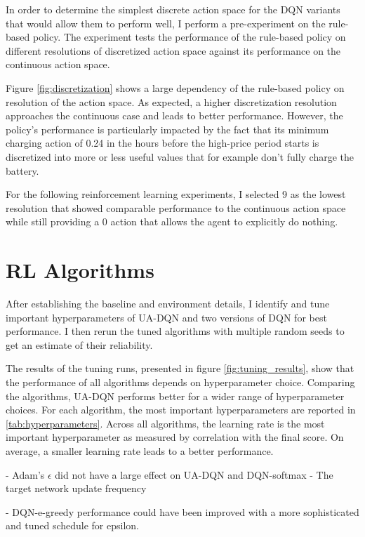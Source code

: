 In order to determine the simplest discrete action space for the DQN variants that would allow them to perform well, I perform a pre-experiment on the rule-based policy.
The experiment tests the performance of the rule-based policy on different resolutions of discretized action space against its performance on the continuous action space.

Figure \ref{fig:discretization} shows a large dependency of the rule-based policy on resolution of the action space.
As expected, a higher discretization resolution approaches the continuous case and leads to better performance.
However, the policy's performance is particularly impacted by the fact that its minimum charging action of 0.24 in the hours before the high-price period starts is discretized into more or less useful values that for example don't fully charge the battery.

For the following reinforcement learning experiments, I selected 9 as the lowest resolution that showed comparable performance to the continuous action space while still providing a 0 action that allows the agent to explicitly do nothing.

\section{RL Algorithms}
After establishing the baseline and environment details, I identify and tune important hyperparameters of UA-DQN and two versions of DQN for best performance.
I then rerun the tuned algorithms with multiple random seeds to get an estimate of their reliability.

The results of the tuning runs, presented in figure \ref{fig:tuning_results}, show that the performance of all algorithms depends on hyperparameter choice.
Comparing the algorithms, UA-DQN performs better for a wider range of hyperparameter choices.
For each algorithm, the most important hyperparameters are reported in \ref{tab:hyperparameters}. Across all algorithms, the learning rate is the most important hyperparameter as measured by correlation with the final score.
On average, a smaller learning rate leads to a better performance.

- Adam's $\epsilon$ did not have a large effect on UA-DQN and DQN-softmax
- The target network update frequency

- DQN-e-greedy performance could have been improved with a more sophisticated and tuned schedule for epsilon.


